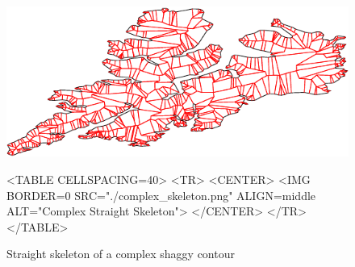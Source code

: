 \begin{figure}[htbp]
\begin{ccTexOnly}
\begin{center}
\includegraphics{Straight_skeleton_2/complex_skeleton} %
\end{center}
\end{ccTexOnly}

\begin{ccHtmlOnly}
<TABLE CELLSPACING=40>
<TR>
<CENTER>
<IMG BORDER=0 SRC="./complex_skeleton.png" ALIGN=middle ALT="Complex Straight Skeleton">
</CENTER>
</TR>
</TABLE>
\end{ccHtmlOnly}

\caption{Straight skeleton of a complex shaggy contour
\label{ComplexSLS}}
\end{figure}

